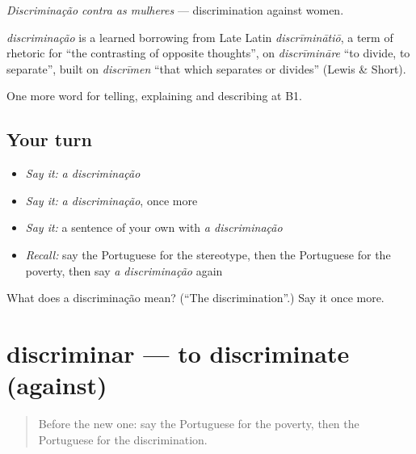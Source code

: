 \emph{Discriminação contra as mulheres} — discrimination against women.

\begin{cousinweb}
\emph{discriminação} is a learned borrowing from Late Latin \emph{discrīminātiō}, a term of rhetoric for \textquotedblleft{}the contrasting of opposite thoughts\textquotedblright{}, on \emph{discrīmināre} \textquotedblleft{}to divide, to separate\textquotedblright{}, built on \emph{discrīmen} \textquotedblleft{}that which separates or divides\textquotedblright{} (Lewis \& Short).
\end{cousinweb}

\begin{grammarlens}[title={What you've built}]
One more word for telling, explaining and describing at B1.
\end{grammarlens}

\subsection*{Your turn}
\begin{itemize}
\raggedright
  \item \emph{Say it:} \emph{a discriminação}
  \item \emph{Say it:} \emph{a discriminação}, once more
  \item \emph{Say it:} a sentence of your own with \emph{a discriminação}
  \item \emph{Recall:} say the Portuguese for the stereotype, then the Portuguese for the poverty, then say \emph{a discriminação} again
\end{itemize}

\begin{tcolorbox}[breakable,colback=teal!4,colframe=teal!35!black,title={Before you move on}]
What does a discriminação mean? (\textquotedblleft{}The discrimination\textquotedblright{}.) Say it once more.
\end{tcolorbox}
\section[discriminar]{discriminar — to discriminate (against)}

\label{lesson:PT-C366-discriminar}



\begin{quote}
Before the new one: say the Portuguese for the poverty, then the Portuguese for the discrimination.
\end{quote}


